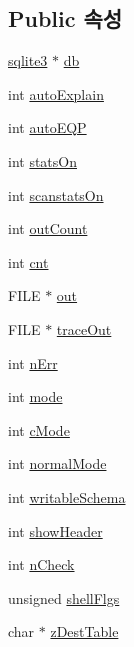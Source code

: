 \subsection*{Public 속성}
\begin{DoxyCompactItemize}
\item 
\hyperlink{sqlite3_8h_a0ef6f2646262c8a9b24368d8ac140f69}{sqlite3} $\ast$ \hyperlink{struct_shell_state_aff5184c68cc62f6db1876cc28ffaf7e0}{db}
\item 
int \hyperlink{struct_shell_state_a1ce80144b7c10d594fcd1cbba9b4a874}{auto\+Explain}
\item 
int \hyperlink{struct_shell_state_ab3a2de04a6ec0c08da36f5b2a8870df0}{auto\+E\+QP}
\item 
int \hyperlink{struct_shell_state_a07631569595d0bac838efef39e6e147d}{stats\+On}
\item 
int \hyperlink{struct_shell_state_aac5055c5404f54e65f52dfdab67cc49d}{scanstats\+On}
\item 
int \hyperlink{struct_shell_state_aa3830a7924f73f6ff4eb27fd11ef4a14}{out\+Count}
\item 
int \hyperlink{struct_shell_state_a2ff4d941ad9ef12844aa5281e98ef7c1}{cnt}
\item 
F\+I\+LE $\ast$ \hyperlink{struct_shell_state_afe68611d577c5398d24a790bac1b5e56}{out}
\item 
F\+I\+LE $\ast$ \hyperlink{struct_shell_state_a308c221cb2f11f68231232a18466c94f}{trace\+Out}
\item 
int \hyperlink{struct_shell_state_a014f654813021513e6bf6091926b3877}{n\+Err}
\item 
int \hyperlink{struct_shell_state_a555e4be1ff388f8fb4e71765e4b08ab2}{mode}
\item 
int \hyperlink{struct_shell_state_a85f31fbf107e9127829e4bbbd1a9b675}{c\+Mode}
\item 
int \hyperlink{struct_shell_state_abf9cf08c0a0cd37b43931ed3e6b28e82}{normal\+Mode}
\item 
int \hyperlink{struct_shell_state_a7b6ccf04e4f4174830faf39116ed74f6}{writable\+Schema}
\item 
int \hyperlink{struct_shell_state_adf90aea39543d0b710b7bb6a4d0236e3}{show\+Header}
\item 
int \hyperlink{struct_shell_state_a0afb65c2cd8e373535a1323770db0040}{n\+Check}
\item 
unsigned \hyperlink{struct_shell_state_a970dc91433f4d8d1c6776d2eb9753c6f}{shell\+Flgs}
\item 
char $\ast$ \hyperlink{struct_shell_state_a1019f63cae8d412dc13a06bb80562247}{z\+Dest\+Table}

\end{DoxyCompactItemize}
